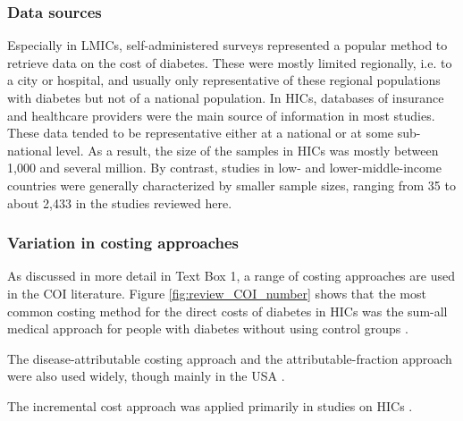 \subsubsection{Data sources}
Especially in \acp{LMIC}, self-administered surveys represented a popular method to retrieve data on the cost of diabetes. These were mostly limited regionally, i.e. to a city or hospital, and usually only representative of these regional populations with diabetes but not of a national population. In \acp{HIC}, databases of insurance and healthcare providers were the main source of information in most studies. These data tended to be representative either at a national or at some sub-national level. As a result, the size of the samples in \acp{HIC} was mostly between 1,000 and several million. By contrast, studies in low- and lower-middle-income countries were generally characterized by smaller sample sizes, ranging from 35 \parencite{Suleiman2006} to about 2,433 \parencite{Yang2012} in the studies reviewed here.

\subsubsection{Variation in costing approaches}
As discussed in more detail in Text Box 1, a range of costing approaches are used in the \ac{COI} literature. Figure \ref{fig:review_COI_number} shows that the most common costing method for the direct costs of diabetes in \acp{HIC} was the sum-all medical approach for people with diabetes without using control groups \parencite{Kirigia2009,Boutayeb2014,Barcelo2003,Jonsson2002b,Ohinmaa2004,Lau2011a,Pohar2007,Gonzalez2009b,Horak2009,Martin2007b,Nolan2006c,Lucioni2003,Morsanutto2006b,Nakamura2008,Arredondo2004,Arredondo2007,Arredondo2005a,Arredondo2011b,Redekop2002b,Bjegovic2007b,Oliva2004a,Ringborg2008a,Chi2011a,Zhou2005a,Condliffe2014,Brandle2003d,Peele2002a,Lee2006,Maciejewski2004}. 

The disease-attributable costing approach \parencite{Suleiman2006,Abdulkadri2009b,Davis2006b,Simpson2003,RodriguezBolanos2010a,Solli2010a,Ballesta2006,Mata2002a,Lin2004,Dall2003a,Buescher2010,Tunceli2010c,Johnson2006d,Honkasalo2014,Bastida2002} and the attributable-fraction approach were also used widely, though mainly in the USA \parencite{AmericalDiabetesAssociation2008,Dawson2002b,Schmitt-Koopmann2004b,Dall2010,Bolin2009d,Honeycutt2009a,Lesniowska2014}. 

The incremental cost approach was applied primarily in studies on \acp{HIC} \parencite{Smith-Spangler2012,Yang2012,Tunceli2010c,Honeycutt2009a,Pohar2007a,Ricordeau2003,Koster2011c,Koster2006c,Koster2012,Esteghamati2009,Chodick2005a,Marchesini2011b,Bruno2012,Norlund2001a,Wirehn2008b,Birnbaum2003c,Durden2009b,Rodbard2010b,Oconnell2012,Trogdon2008a,Ramsey2002a,VanderLinden2009c}.  

